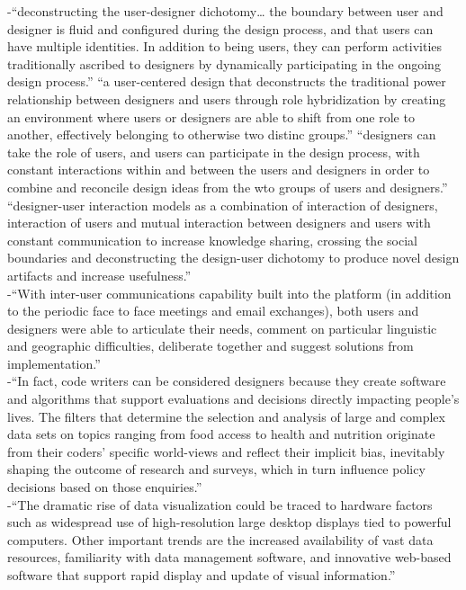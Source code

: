 -{\color{orange}“deconstructing the user-designer dichotomy… the boundary between user and designer is fluid and configured during the design process, and that users can have multiple identities. In addition to being users, they can perform activities traditionally ascribed to designers by dynamically participating in the ongoing design process.” “a user-centered design that deconstructs the traditional power relationship between designers and users through role hybridization by creating an environment where users or designers are able to shift from one role to another, effectively belonging to otherwise two distinc groups.” “designers can take the role of users, and users can participate in the design process, with constant interactions within and between the users and designers in order to combine and reconcile design ideas from the wto groups of users and designers.” “designer-user interaction models as a combination of interaction of designers, interaction of users and mutual interaction between designers and users with constant communication to increase knowledge sharing, crossing the social boundaries and deconstructing the design-user dichotomy to produce novel design artifacts and increase usefulness.”
\cite{Karimzadeh2019}}\\
-{\color{orange}“With inter-user communications capability built into the platform (in addition to the periodic face to face meetings and email exchanges), both users and designers were able to articulate their needs, comment on particular linguistic and geographic difficulties, deliberate together and suggest solutions from implementation.”\cite{Karimzadeh2019}}\\
-{\color{orange}“In fact, code writers can be considered designers because they create software and algorithms that support evaluations and decisions directly impacting people’s lives. The filters that determine the selection and analysis of large and complex data sets on topics ranging from food access to health and nutrition originate from their coders’ specific world-views and reflect their implicit bias, inevitably shaping the outcome of research and surveys, which in turn influence policy decisions based on those enquiries.” \cite{Parasecoli2019}}\\
-{\color{orange}“The dramatic rise of data visualization could be traced to hardware factors such as widespread use of high-resolution large desktop displays tied to powerful computers. Other important trends are the increased availability of vast data resources, familiarity with data management software, and innovative web-based software that support rapid display and update of visual information.”\cite{Shneiderman2020}}\\
